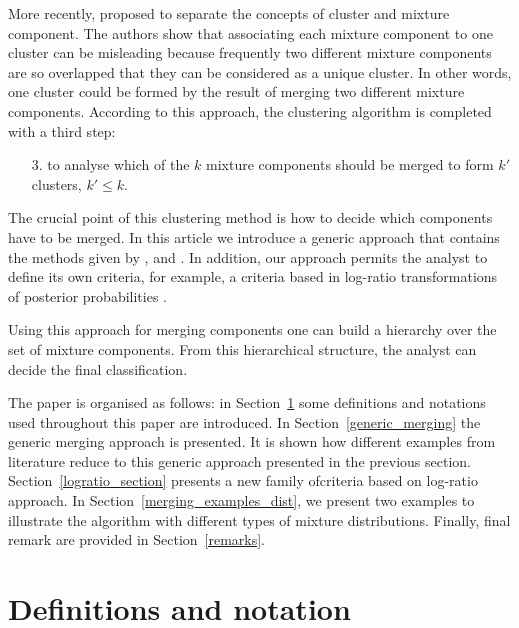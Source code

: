 \documentclass[submit]{smj}
\theoremstyle{definition}
\begin{document}
More recently, \cite{lee2004combining,hennig2010methods,baudry2010combining,melnykov2013distribution,pastore2013merging} proposed to separate the concepts of cluster and mixture component. The authors show that associating each mixture component to one cluster can be misleading because frequently two different mixture components are so overlapped that they can be considered as a unique cluster. In other words, one cluster could be formed by the result of merging two different mixture components. According to this approach, the clustering algorithm is completed with a third step:

\begin{itemize}
\item[3.] to analyse which of the $k$ mixture components should be merged to form $k'$ clusters, $k' \leq k$.
\end{itemize}

The crucial point of this clustering method is how to decide which components have to be merged. In this article we introduce a generic approach that contains the methods given by \cite{baudry2010combining}, \cite{hennig2010methods} and \cite{longford2014}. In addition, our approach permits the analyst  to define its own criteria, for example, a criteria based in log-ratio transformations of posterior probabilities \citep{aitchison1986statistical}.

Using this approach for merging components one can build a hierarchy over the set of mixture components. From this hierarchical structure, the analyst can decide the final classification.

The paper is organised as follows: in Section~\ref{definitions} some definitions and notations used throughout this paper are introduced. In Section~\ref{generic_merging} the generic merging approach is presented. It is shown how different examples from literature reduce to this generic approach presented in the previous section. Section~\ref{logratio_section} presents a new family ofcriteria based on log-ratio approach. In Section~\ref{merging_examples_dist}, we present two examples to illustrate the algorithm with different types of mixture distributions. Finally, final remark are provided in Section~\ref{remarks}.

\section{Definitions and notation}\label{definitions}
\end{document}
